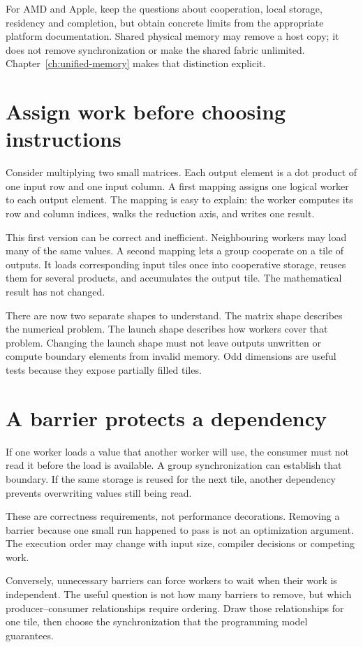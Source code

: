 For AMD and Apple, keep the questions about cooperation, local storage,
residency and completion, but obtain concrete limits from the appropriate
platform documentation. Shared physical memory may remove a host copy;
it does not remove synchronization or make the shared fabric unlimited.
Chapter~\ref{ch:unified-memory} makes that distinction explicit.

\section{Assign work before choosing instructions}
Consider multiplying two small matrices. Each output element is a dot
product of one input row and one input column. A first mapping assigns
one logical worker to each output element. The mapping is easy to explain:
the worker computes its row and column indices, walks the reduction axis,
and writes one result.

This first version can be correct and inefficient. Neighbouring workers
may load many of the same values. A second mapping lets a group cooperate
on a tile of outputs. It loads corresponding input tiles once into
cooperative storage, reuses them for several products, and accumulates
the output tile. The mathematical result has not changed.

There are now two separate shapes to understand. The matrix shape
describes the numerical problem. The launch shape describes how workers
cover that problem. Changing the launch shape must not leave outputs
unwritten or compute boundary elements from invalid memory. Odd
dimensions are useful tests because they expose partially filled tiles.

\section{A barrier protects a dependency}
If one worker loads a value that another worker will use, the consumer
must not read it before the load is available. A group synchronization
can establish that boundary. If the same storage is reused for the
next tile, another dependency prevents overwriting values still being read.

These are correctness requirements, not performance decorations.
Removing a barrier because one small run happened to pass is not an
optimization argument. The execution order may change with input size,
compiler decisions or competing work.

Conversely, unnecessary barriers can force workers to wait when their
work is independent. The useful question is not how many barriers to
remove, but which producer--consumer relationships require ordering.
Draw those relationships for one tile, then choose the synchronization
that the programming model guarantees.

